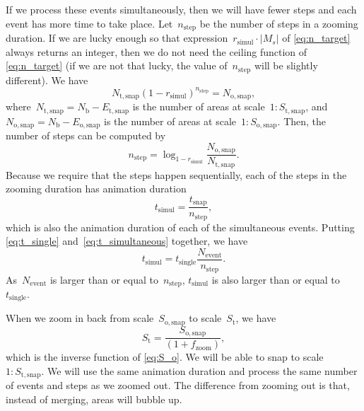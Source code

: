 \documentclass[twocolumn]{svjour3}          %
\begin{document}
If we process these events simultaneously, 
then we will have fewer steps and 
each event has more time to take place.
Let~$n_\mathrm{step}$ be the number of steps in a zooming duration.
If we are lucky enough so that
expression~$r_\mathrm{simul} \cdot |M_s|$ of \eq\ref{eq:n_target}
always returns an integer, 
then we do not need the ceiling function of \eq\ref{eq:n_target}
(if we are not that lucky, the value of~$n_\mathrm{step}$ will be slightly different).
We have 
\begin{equation*}
N_\mathrm{t,snap} (1-r_\mathrm{simul})^{n_\mathrm{step}} = N_\mathrm{o,snap},
\end{equation*}
where~$N_\mathrm{t,snap} = N_\mathrm{b}- E_\mathrm{t,snap}$ 
is the number of areas at scale~$1:S_\mathrm{t,snap}$,
and~$N_\mathrm{o,snap} = N_\mathrm{b}- E_\mathrm{o,snap}$
is the number of areas at scale~$1:S_\mathrm{o,snap}$.
Then, the number of steps can be computed by
\begin{equation*}
n_\mathrm{step} = \log_{1-r_\mathrm{simul}} 
    \frac{N_\mathrm{o,snap}}{N_\mathrm{t,snap}}.
\end{equation*}
Because we require that the steps happen sequentially,
each of the steps in the zooming duration has
animation duration
\begin{equation}
\label{eq:t_simultaneous}
t_\mathrm{simul} = \frac{t_\mathrm{snap}}{n_\mathrm{step}},
\end{equation}
which is also the animation duration of each of the simultaneous events.
Putting \eqs\ref{eq:t_single} and~\ref{eq:t_simultaneous} together,
we have
\begin{equation*}
\label{eq:t_compare_appx}
t_\mathrm{simul} = t_\mathrm{single}  \frac{N_\mathrm{event}}{n_\mathrm{step}}.
\end{equation*}
As~$N_\mathrm{event}$ is larger than or equal to~$n_\mathrm{step}$,
$t_\mathrm{simul}$ is also larger than or equal to~$t_\mathrm{single}$.


When we zoom in back from scale~$S_\mathrm{o,snap}$ to scale~$S_\mathrm{t}$, 
we have
\begin{equation*}
\label{eq:S_i}
S_\mathrm{t} = \frac{S_\mathrm{o,snap}}{(1 + f_\mathrm{zoom})},
\end{equation*}
which is the inverse function of \eq\ref{eq:S_o}.
We will be able to snap to scale~$1:S_\mathrm{t,snap}$.
We will use the same animation duration and 
process the same number of events and steps as we zoomed out.
The difference from zooming out is that, instead of merging, 
areas will bubble up.
\end{document}
